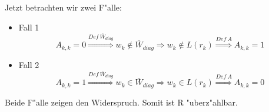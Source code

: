 \documentclass[a4paper,11pt]{scrartcl}
\begin{document}
	Jetzt betrachten wir zwei F"alle:
	
	\begin{itemize}
		\item Fall 1
		$$
		A_{k,k} = 0 \overset{Def\ \bar{W}_{diag}}{\Longrightarrow} w_k \notin \bar{W}_{diag} \Longrightarrow w_k \notin L(r_k)	 \overset{Def\ A}{\Longrightarrow} A_{k,k} = 1
		$$
		
		\item Fall 2
		$$
		A_{k,k} = 1 \overset{Def\ \bar{W}_{diag}}{\Longrightarrow} w_k \in \bar{W}_{diag} \Longrightarrow w_k \in L(r_k) \overset{Def\ A}{\Longrightarrow} A_{k,k} = 0
		$$		
	\end{itemize}
	
	Beide F"alle zeigen den Widerspruch. Somit ist R "uberz"ahlbar.
	
	





















	
\end{document}
